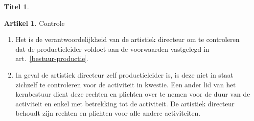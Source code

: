 \documentclass[a4paper,10pt]{article}
\theoremstyle{definition}
\newtheorem{titel}{\newline\Large Titel}
\newtheorem{artikelbase}{\large Artikel}
\newenvironment{artikel}
  {\begin{artikelbase}}
  {\smallskip
   \end{artikelbase}}
\newcommand{\ttextenum}{\mbox{}}
\begin{document}
\begin{titel}

  \begin{artikel}\label{bestuur-vervanging}Controle\ttextenum
    \begin{enumerate}
      \item
        Het is de verantwoordelijkheid van de artistiek directeur om te controleren dat de productieleider voldoet aan de voorwaarden vastgelegd in art.~\ref{bestuur-productie}.
      \item
        In geval de artistiek directeur zelf productieleider is, is deze niet in staat zichzelf te controleren voor de activiteit in kwestie.
        Een ander lid van het kernbestuur dient deze rechten en plichten over te nemen voor de duur van de activiteit en enkel met betrekking tot de activiteit.
        De artistiek directeur behoudt zijn rechten en plichten voor alle andere activiteiten.
    \end{enumerate} 
  \end{artikel}

\end{titel}

\end{document}
